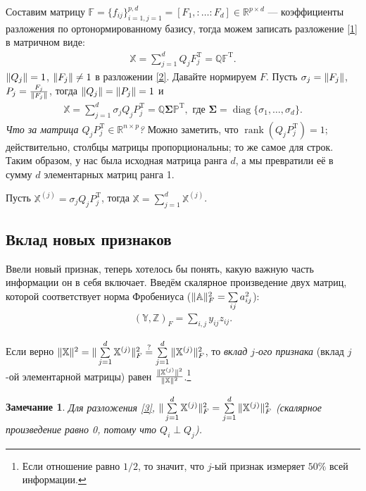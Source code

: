 \documentclass[specialist, 12pt,
subf, %
href, colorlinks=true,
substylefile = spbu.rtx,
]{disser}
\newtheorem{proposition}{Предложение}
\newtheorem{remark}{Замечание}
\DeclareMathOperator{\diag}{diag}
\DeclareMathOperator{\rnk}{rank}
\begin{document}
Составим матрицу $\mathbb{F} = \{f_{ij}\}_{i = 1, j = 1}^{p,d}= [F_1,:\ldots:F_d] \in \mathbb{R}^{p \times d}$ --- коэффициенты разложения по ортонормированному базису, тогда можем записать разложение \eqref{1} в матричном виде:
\begin{gather}\label{2}
\mathbb{X} = \sum\limits_{j = 1}^d Q_j F_j^{\mathrm{T}} = \mathbb{Q}\mathbb{F}^{\mathrm{T}}.
\end{gather}
$\Arrowvert Q_j\Arrowvert = 1$, $\Arrowvert F_j\Arrowvert \neq 1$ в разложении \eqref{2}. Давайте нормируем $F$. Пусть $\sigma_j = \Arrowvert F_j\Arrowvert$, $P_j = \frac{F_j}{\Arrowvert F_j\Arrowvert}$, тогда $\Arrowvert Q_j\Arrowvert = \Arrowvert P_j\Arrowvert = 1$ и
\begin{gather}\label{3}
\mathbb{X} = \sum\limits_{j = 1}^d \sigma_j Q_j P_j^{\mathrm{T}} = \mathbb{Q} \mathbf{\Sigma} \mathbb{P}^{\mathrm{T}}, \text{ где $\mathbf{\Sigma} = \diag\{\sigma_1, \ldots, \sigma_d\}$.}
\end{gather}
\textit{Что за матрица $Q_jP_j^{\mathrm{T}} \in \mathbb{R}^{n \times p}$?} Можно заметить, что $\rnk(Q_jP_j^{\mathrm{T}}) = 1$; действительно, столбцы матрицы пропорциональны; то же самое для строк. Таким образом, у нас была исходная матрица ранга $d$, а мы превратили её в сумму $d$ элементарных матриц ранга 1.


Пусть $\mathbb{X}^{(j)} = \sigma_jQ_jP_j^{\mathrm{T}}$, тогда $\mathbb{X} = \sum\limits_{j = 1}^d \mathbb{X}^{(j)}$.
\subsection{Вклад новых признаков}
Ввели новый признак, теперь хотелось бы понять, какую важную часть информации он в себя включает. Введём скалярное произведение двух матриц, которой соответствует норма Фробениуса ($\Arrowvert \mathbb{A}\Arrowvert^2_F = \sum\limits_{ij}a_{ij}^2$):
\begin{gather*}
(\mathbb{Y}, \mathbb{Z})_F = \sum\limits_{i, j} y_{ij} z_{ij}.
\end{gather*}

Если верно $\Arrowvert\mathbb{X}\Arrowvert^2 = \Arrowvert\sum\limits_{j = 1}^d \mathbb{X}^{(j)}\Arrowvert^2_F \stackrel{?}{=} \sum\limits_{j = 1}^d\Arrowvert\mathbb{X}^{(j)}\Arrowvert^2_F$, то \textit{вклад $j$-ого признака} (вклад $j$-ой элементарной матрицы) равен $\frac{\Arrowvert\mathbb{X}^{(j)}\Arrowvert^2}{\Arrowvert\mathbb{X}\Arrowvert^2}$.\footnote{Если отношение равно $1/2$, то значит, что $j$-ый признак измеряет $50\%$ всей информации.}
\begin{remark}
	Для разложения \eqref{3}, $\Arrowvert\sum\limits_{j = 1}^d \mathbb{X}^{(j)}\Arrowvert^2_F = \sum\limits_{j = 1}^d\Arrowvert\mathbb{X}^{(j)}\Arrowvert^2_F$ (скалярное произведение равно 0, потому что $Q_i \perp Q_j$).
\end{remark}
\end{document}
